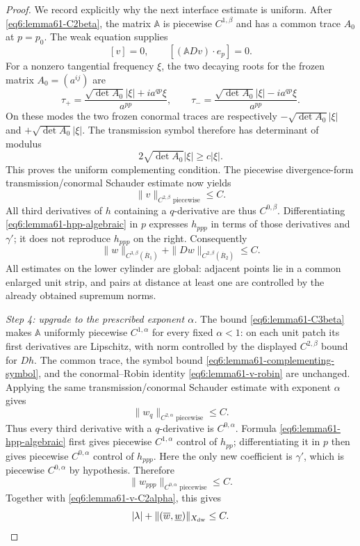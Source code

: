 \documentclass[11pt,reqno]{amsart}
\numberwithin{equation}{section}
\theoremstyle{definition}
\theoremstyle{remark}
\begin{document}
\begin{proof}
We record explicitly why the next interface estimate is uniform.
After \eqref{eq6:lemma61-C2beta}, the matrix $\mathbb A$ is
piecewise $C^{1,\beta}$ and has a common trace $A_0$ at $p=p_0$.
The weak equation supplies
\[
 [v]=0,\qquad
 [(\mathbb A Dv)\mathbin{\cdot}e_p]=0.
\]
For a nonzero tangential frequency $\xi$, the two decaying roots for
the frozen matrix $A_0=(a^{ij})$ are
\[
 \tau_+=\frac{\sqrt{\det A_0}|\xi|+ia^{qp}\xi}{a^{pp}},
 \qquad
 \tau_-=\frac{\sqrt{\det A_0}|\xi|-ia^{qp}\xi}{a^{pp}}.
\]
On these modes the two frozen conormal traces are respectively
$-\sqrt{\det A_0}|\xi|$ and
$+\sqrt{\det A_0}|\xi|$.  The transmission symbol therefore has
determinant of modulus
\begin{equation}\label{eq6:lemma61-complementing-symbol}
 2\sqrt{\det A_0}|\xi|\ge c|\xi|.
\end{equation}
This proves the uniform complementing condition.  The piecewise
divergence-form transmission/conormal Schauder estimate
\cite{Agmon,Lady} now yields
\[
 \|v\|_{C^{2,\beta}\text{ piecewise}}\le C.
\]
All third derivatives of $h$ containing a $q$-derivative are thus
$C^{0,\beta}$.  Differentiating
\eqref{eq6:lemma61-hpp-algebraic} in $p$ expresses $h_{ppp}$ in
terms of those derivatives and $\gamma'$; it does not reproduce
$h_{ppp}$ on the right.  Consequently
\begin{equation}\label{eq6:lemma61-C3beta}
 \|w\|_{C^{3,\beta}(\overline R_1)}
 +\|Dw\|_{C^{2,\beta}(\overline R_2)}\le C.
\end{equation}
All estimates on the lower cylinder are global: adjacent points lie
in a common enlarged unit strip, and pairs at distance at least one
are controlled by the already obtained supremum norms.

\smallskip
\noindent\emph{Step 4: upgrade to the prescribed exponent
$\alpha$.}
The bound \eqref{eq6:lemma61-C3beta} makes $\mathbb A$ uniformly
piecewise $C^{1,\alpha}$ for every fixed $\alpha<1$: on each unit
patch its first derivatives are Lipschitz, with norm controlled by
the displayed $C^{2,\beta}$ bound for $Dh$.  The common trace,
the symbol bound \eqref{eq6:lemma61-complementing-symbol}, and the
conormal--Robin identity \eqref{eq6:lemma61-v-robin} are unchanged.
Applying the same transmission/conormal Schauder estimate with
exponent $\alpha$ gives
\begin{equation}\label{eq6:lemma61-v-C2alpha}
 \|w_q\|_{C^{2,\alpha}\text{ piecewise}}\le C.
\end{equation}
Thus every third derivative with a $q$-derivative is
$C^{0,\alpha}$.  Formula
\eqref{eq6:lemma61-hpp-algebraic} first gives piecewise
$C^{1,\alpha}$ control of $h_{pp}$; differentiating it in $p$ then
gives piecewise $C^{0,\alpha}$ control of $h_{ppp}$.  Here the only
new coefficient is $\gamma'$, which is piecewise
$C^{0,\alpha}$ by hypothesis.  Therefore
\[
 \|w_{ppp}\|_{C^{0,\alpha}\text{ piecewise}}\le C.
\]
Together with \eqref{eq6:lemma61-v-C2alpha}, this gives
\begin{equation}\label{eq6:lemma61-Xdw-bound}
 |\lambda|+
 \|(\overline w,\underline w)\|_{X_{\rm dw}}\le C.
\end{equation}


\end{proof}
\end{document}
